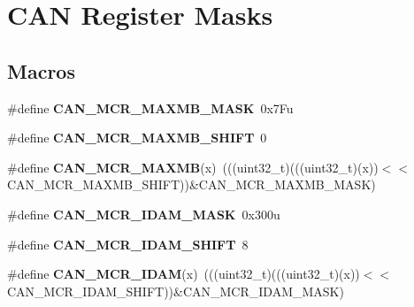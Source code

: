 \hypertarget{group__CAN__Register__Masks}{}\section{C\+AN Register Masks}
\label{group__CAN__Register__Masks}
\subsection*{Macros}
\begin{DoxyCompactItemize}
\item 
\#define {\bfseries C\+A\+N\+\_\+\+M\+C\+R\+\_\+\+M\+A\+X\+M\+B\+\_\+\+M\+A\+SK}~0x7\+Fu\hypertarget{group__CAN__Register__Masks_ga86b59c74c0b9f310c3922c7c8c04dd03}{}\label{group__CAN__Register__Masks_ga86b59c74c0b9f310c3922c7c8c04dd03}

\item 
\#define {\bfseries C\+A\+N\+\_\+\+M\+C\+R\+\_\+\+M\+A\+X\+M\+B\+\_\+\+S\+H\+I\+FT}~0\hypertarget{group__CAN__Register__Masks_ga0807275385d5041baeca3bb7ddb4bdf5}{}\label{group__CAN__Register__Masks_ga0807275385d5041baeca3bb7ddb4bdf5}

\item 
\#define {\bfseries C\+A\+N\+\_\+\+M\+C\+R\+\_\+\+M\+A\+X\+MB}(x)~(((uint32\+\_\+t)(((uint32\+\_\+t)(x))$<$$<$C\+A\+N\+\_\+\+M\+C\+R\+\_\+\+M\+A\+X\+M\+B\+\_\+\+S\+H\+I\+FT))\&C\+A\+N\+\_\+\+M\+C\+R\+\_\+\+M\+A\+X\+M\+B\+\_\+\+M\+A\+SK)\hypertarget{group__CAN__Register__Masks_ga3b4797e2f712a545396f339653929457}{}\label{group__CAN__Register__Masks_ga3b4797e2f712a545396f339653929457}

\item 
\#define {\bfseries C\+A\+N\+\_\+\+M\+C\+R\+\_\+\+I\+D\+A\+M\+\_\+\+M\+A\+SK}~0x300u\hypertarget{group__CAN__Register__Masks_ga758ccb033a3d823109f8bf4e23b46827}{}\label{group__CAN__Register__Masks_ga758ccb033a3d823109f8bf4e23b46827}

\item 
\#define {\bfseries C\+A\+N\+\_\+\+M\+C\+R\+\_\+\+I\+D\+A\+M\+\_\+\+S\+H\+I\+FT}~8\hypertarget{group__CAN__Register__Masks_gae76a75d680b0c33f41429f14132ee78f}{}\label{group__CAN__Register__Masks_gae76a75d680b0c33f41429f14132ee78f}

\item 
\#define {\bfseries C\+A\+N\+\_\+\+M\+C\+R\+\_\+\+I\+D\+AM}(x)~(((uint32\+\_\+t)(((uint32\+\_\+t)(x))$<$$<$C\+A\+N\+\_\+\+M\+C\+R\+\_\+\+I\+D\+A\+M\+\_\+\+S\+H\+I\+FT))\&C\+A\+N\+\_\+\+M\+C\+R\+\_\+\+I\+D\+A\+M\+\_\+\+M\+A\+SK)\hypertarget{group__CAN__Register__Masks_ga864867bd7c0475f033af7efa7f021b07}{}\label{group__CAN__Register__Masks_ga864867bd7c0475f033af7efa7f021b07}


\end{DoxyCompactItemize}
